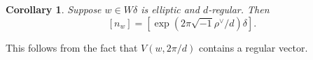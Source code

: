 \documentclass[10pt,leqno]{article}
\newtheorem{corollary}[equation]{Corollary}
\renewcommand{\a}{\mathfrak a}
\newcommand{\ch}[1]{#1^\vee}
\def\a{\alpha}
\def\G{\Gamma}
\def\d{\delta}
\begin{document}
\begin{corollary}
Suppose $w\in W\delta$ is elliptic and $d$-regular. Then
$$
[n_w]=[\exp(2\pi \sqrt{-1}\ch\rho/d)\delta].
$$
\end{corollary}

This follows from the fact that $V(w,2\pi/d)$ contains a regular vector.

\begin{comment}
This follows from the fact that the sequence consisting of a singleton
$(2\pi/d)$ is admissible in the sense of
\cite{he_nie_minimal_finite}*{\S 5.2}, see Remark
\ref{r:full}.
\end{comment}

\begin{comment}
\subsection{Example}\label{eg:regular}
Let $W$ be of type $E_6$ and let $\d$ be the unique nontrivial
automorphism of $(W, \Pi)$. Up to $W$-conjugation, there is a unique
3-regular element $w \in W \d$ of order 6, whose characteristic
polynomial is $\Phi_6 \Phi_3^2$, see \cite{springer_regular}*{Table
  8}. Note that $w$ is regular, but not $\mathbb Z$-regular. Moreover,
$\G_w=\{2\pi/6, 2\pi/3\}$ and the associated filtration is
$0 \subsetneqq F_1 = V(w,\frac{2\pi}{6}) \subsetneqq V$. Let
$\Delta_1 = \{\a \in \Delta; \langle\alpha, F_1\rangle = 0\}$.

Notice that $w^3 \in W\d$ is 1-regular and $\dim V^{w^3}=4$. On the other hand, $\d$ is also 1-regular and $\dim V^\d=4$. So $w^3$ is conjugate to $\d$ by
\cite{springer_regular}*{Theorem 6.4 (iv)}. In particular, $V(w, \frac{2\pi}{6})$ is conjugate to  $V(\d, \pi)$.

The simple roots of $E_6$ are labeled as follows.

$$
\begin{dynkinDiagram}[Kac,label,ordering=Bourbaki,root radius=.12cm, edge  length=1.0cm]{E}{6}
\end{dynkinDiagram}
$$
\medskip

The $\d$-orbits on $\Pi$ are $\{1, 6\}$, $\{3, 5\}$, $\{2\}$ and $\{4\}$. So $V(\d, \pi)$ is spanned by $(1, 0, 0, 0, 0, -1)$ and $(0, 0, 1, 0, -1, 0)$. Here $\mu=(\mu_1, \dots, \mu_6) \in \mathbb Z^6$ stands for the vector $\sum_{i=1}^6 \mu_i \a_i^\vee \in \mathbb Z \Delta^\vee$. One checks that the root system $\Delta' = \{\a \in \Delta; \langle \a, V(\d, \pi)\rangle=0\}$ is of type $D_4$, which is conjugate to the root system $\Delta''$ spanned by $\{2, 3, 4, 5\} \subseteq \Pi$. Up to $W$-conjugation, we can assume $\Delta_1 = \Delta''$.


\end{comment}
\end{document}
